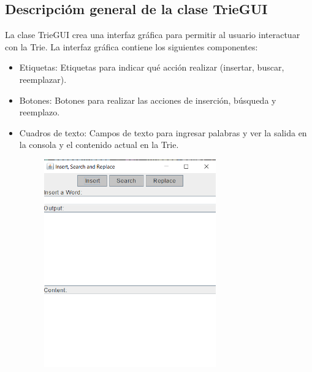 \documentclass{article}
\begin{document}
	\subsection{Descripcióm general de la clase TrieGUI}
	La clase TrieGUI crea una interfaz gráfica para permitir al usuario interactuar con la Trie. 		    La interfaz gráfica contiene los siguientes componentes:
	\begin{itemize}
		\item Etiquetas: Etiquetas para indicar qué acción realizar (insertar, buscar, reemplazar).
		\item Botones: Botones para realizar las acciones de inserción, búsqueda y reemplazo.
		\item Cuadros de texto: Campos de texto para ingresar palabras y ver la salida en la consola y el contenido actual en la Trie.
		
		\begin{figure}[H]
		\centering
		\includegraphics[width=0.7\textwidth, 		height=0.7\textwidth,keepaspectratio]{pruebas/visual1.png}
	\end{figure}

	\end{itemize}
	\clearpage
\end{document}
